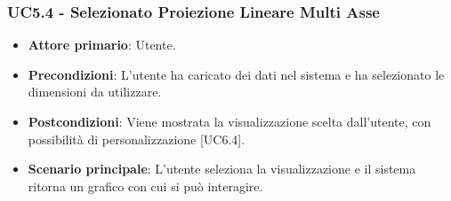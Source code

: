 \subsubsection{UC5.4 - Selezionato Proiezione Lineare Multi Asse}

\begin{itemize}
	\item \textbf{Attore primario}: Utente.
	\item \textbf{Precondizioni}: L'utente ha caricato dei dati nel sistema e ha selezionato le dimensioni da utilizzare.
	\item \textbf{Postcondizioni}: Viene mostrata la visualizzazione  scelta dall'utente, con possibilità di personalizzazione [UC6.4].
	\item \textbf{Scenario principale}: L'utente seleziona la visualizzazione  e il sistema ritorna un grafico con cui si può interagire.
\end{itemize}